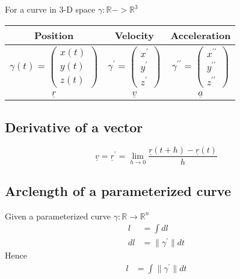 For a curve in 3-D space $\gamma : \mathbb{R} -> \mathbb{R}^3$
   \begin{center}
      \begin{tabular}{|c|c|c|}
         \hline
         Position & Velocity & Acceleration \\ 
         \hline
         $\gamma (t) = \begin{pmatrix} x(t) \\ y(t) \\ z(t)   \end{pmatrix}$ &
         $\gamma^{\prime} = \begin{pmatrix} x^{\prime} \\ y^{\prime} \\ z^{\prime}   \end{pmatrix}$ &
         $\gamma^{\prime \prime} = \begin{pmatrix} x^{\prime \prime} \\ y^{\prime \prime} \\ z^{\prime \prime}   \end{pmatrix}$ \\ 
         \hline
         $ \underline{r}$ & $ \underline{v}$ & $ \underline{a}$ \\
         \hline
      \end{tabular}
   \end{center}

\subsection{Derivative of a vector}
\begin{framed}
   \[
   \underline{v} = \underline{r}^{\prime} = \lim_{h \to 0} \frac{ \underline{r}(t+h) - \underline{r}(t)}{h}
   \] 
\end{framed}

\subsection{Arclength of a parameterized curve}
\begin{framed}
   Given a parameterized curve $\gamma : \mathbb{R} \rightarrow \mathbb{R}^n$
   \begin{align*}
      l &= \int dl\\
      dl &= \lVert \gamma^{\prime} \rVert dt
   \end{align*}
   Hence
   \begin{align*}
      l &= \int \lVert \gamma^{\prime} \rVert dt
 \\
   \end{align*}

\end{framed}

